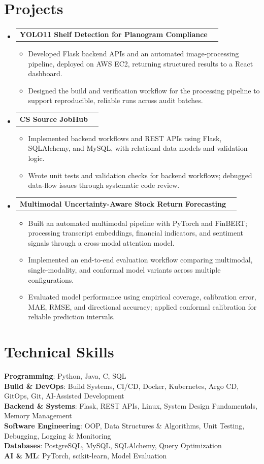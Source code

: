\documentclass[letterpaper,11pt]{article}
\makeatletter
\newcommand{\resumeItem}[1]{
  \item\small{
    {#1 \vspace{-2pt}}
  }
}
\newcommand{\resumeProjectHeading}[2]{
    \item
    \begin{tabular*}{0.97\textwidth}{l@{\extracolsep{\fill}}r}
      \small#1 & #2 \\
    \end{tabular*}\vspace{-7pt}
}
\newcommand{\resumeSubHeadingListStart}{\begin{itemize}[leftmargin=0.15in, label={}]}
\newcommand{\resumeSubHeadingListEnd}{\end{itemize}}
\newcommand{\resumeItemListStart}{\begin{itemize}}
\newcommand{\resumeItemListEnd}{\end{itemize}\vspace{-5pt}}
\makeatother
\begin{document}
\section{Projects}
    \resumeSubHeadingListStart
      \resumeProjectHeading
          {\textbf{YOLO11 Shelf Detection for Planogram Compliance}}{}
          \resumeItemListStart
            \resumeItem{Developed Flask backend APIs and an automated image-processing pipeline, deployed on AWS EC2, returning structured results to a React dashboard.}
            \resumeItem{Designed the build and verification workflow for the processing pipeline to support reproducible, reliable runs across audit batches.}
          \resumeItemListEnd
      \resumeProjectHeading
          {\textbf{CS Source JobHub}}{}
          \resumeItemListStart
            \resumeItem{Implemented backend workflows and REST APIs using Flask, SQLAlchemy, and MySQL, with relational data models and validation logic.}
            \resumeItem{Wrote unit tests and validation checks for backend workflows; debugged data-flow issues through systematic code review.}
          \resumeItemListEnd
      \resumeProjectHeading
          {\textbf{Multimodal Uncertainty-Aware Stock Return Forecasting}}{}
          \resumeItemListStart
            \resumeItem{Built an automated multimodal pipeline with PyTorch and FinBERT; processing transcript embeddings, financial indicators, and sentiment signals through a cross-modal attention model.}
            \resumeItem{Implemented an end-to-end evaluation workflow comparing multimodal, single-modality, and conformal model variants across multiple configurations.}
            \resumeItem{Evaluated model performance using empirical coverage, calibration error, MAE, RMSE, and directional accuracy; applied conformal calibration for reliable prediction intervals.}
          \resumeItemListEnd
    \resumeSubHeadingListEnd

\section{Technical Skills}
 \begin{itemize}[leftmargin=0.15in, label={}]
    \small{\item{
     \textbf{Programming}{: Python, Java, C, SQL} \\
     \textbf{Build \& DevOps}{: Build Systems, CI/CD, Docker, Kubernetes, Argo CD, GitOps, Git, AI-Assisted Development} \\
     \textbf{Backend \& Systems}{: Flask, REST APIs, Linux, System Design Fundamentals, Memory Management} \\
     \textbf{Software Engineering}{: OOP, Data Structures \& Algorithms, Unit Testing, Debugging, Logging \& Monitoring} \\
     \textbf{Databases}{: PostgreSQL, MySQL, SQLAlchemy, Query Optimization} \\
     \textbf{AI \& ML}{: PyTorch, scikit-learn, Model Evaluation} \\
    }}
 \end{itemize}
\end{document}
